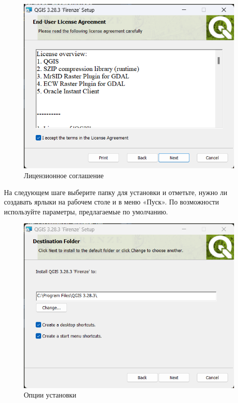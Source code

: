 \documentclass[
  12pt,
]{book}
\begin{document}
\begin{figure}
\centering
\includegraphics{images/installation_instruction_win/win02.png}
\caption{Лицензионное соглашение}
\end{figure}

На следующем шаге выберите папку для установки и отметьте, нужно ли создавать ярлыки на рабочем столе и в меню «Пуск». По возможности используйте параметры, предлагаемые по умолчанию.

\begin{figure}
\centering
\includegraphics{images/installation_instruction_win/win03.png}
\caption{Опции установки}
\end{figure}
\end{document}
